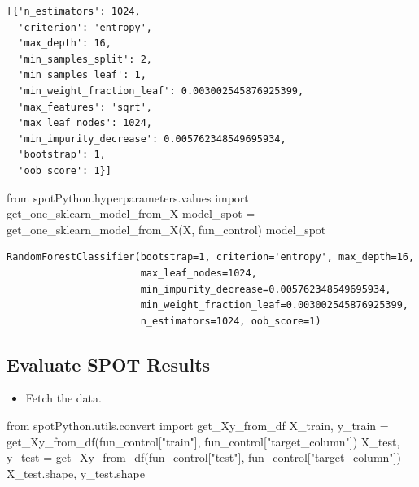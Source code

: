 \documentclass[
  letterpaper,
  DIV=11,
  numbers=noendperiod]{scrreprt}
\newenvironment{Shaded}{\begin{snugshade}}{\end{snugshade}}
\newcommand{\ImportTok}[1]{\textcolor[rgb]{0.00,0.46,0.62}{#1}}
\newcommand{\NormalTok}[1]{\textcolor[rgb]{0.00,0.23,0.31}{#1}}
\newcommand{\OperatorTok}[1]{\textcolor[rgb]{0.37,0.37,0.37}{#1}}
\newcommand{\StringTok}[1]{\textcolor[rgb]{0.13,0.47,0.30}{#1}}
\providecommand{\tightlist}{%
  \setlength{\itemsep}{0pt}\setlength{\parskip}{0pt}}\usepackage{longtable,booktabs,array}
\begin{document}
\begin{verbatim}
[{'n_estimators': 1024,
  'criterion': 'entropy',
  'max_depth': 16,
  'min_samples_split': 2,
  'min_samples_leaf': 1,
  'min_weight_fraction_leaf': 0.003002545876925399,
  'max_features': 'sqrt',
  'max_leaf_nodes': 1024,
  'min_impurity_decrease': 0.005762348549695934,
  'bootstrap': 1,
  'oob_score': 1}]
\end{verbatim}

\begin{Shaded}
\begin{Highlighting}[]
\ImportTok{from}\NormalTok{ spotPython.hyperparameters.values }\ImportTok{import}\NormalTok{ get\_one\_sklearn\_model\_from\_X}
\NormalTok{model\_spot }\OperatorTok{=}\NormalTok{ get\_one\_sklearn\_model\_from\_X(X, fun\_control)}
\NormalTok{model\_spot}
\end{Highlighting}
\end{Shaded}

\begin{verbatim}
RandomForestClassifier(bootstrap=1, criterion='entropy', max_depth=16,
                       max_leaf_nodes=1024,
                       min_impurity_decrease=0.005762348549695934,
                       min_weight_fraction_leaf=0.003002545876925399,
                       n_estimators=1024, oob_score=1)
\end{verbatim}

\hypertarget{evaluate-spot-results}{%
\subsection{Evaluate SPOT Results}\label{evaluate-spot-results}}

\begin{itemize}
\tightlist
\item
  Fetch the data.
\end{itemize}

\begin{Shaded}
\begin{Highlighting}[]
\ImportTok{from}\NormalTok{ spotPython.utils.convert }\ImportTok{import}\NormalTok{ get\_Xy\_from\_df}
\NormalTok{X\_train, y\_train }\OperatorTok{=}\NormalTok{ get\_Xy\_from\_df(fun\_control[}\StringTok{"train"}\NormalTok{], fun\_control[}\StringTok{"target\_column"}\NormalTok{])}
\NormalTok{X\_test, y\_test }\OperatorTok{=}\NormalTok{ get\_Xy\_from\_df(fun\_control[}\StringTok{"test"}\NormalTok{], fun\_control[}\StringTok{"target\_column"}\NormalTok{])}
\NormalTok{X\_test.shape, y\_test.shape}
\end{Highlighting}
\end{Shaded}
\end{document}
